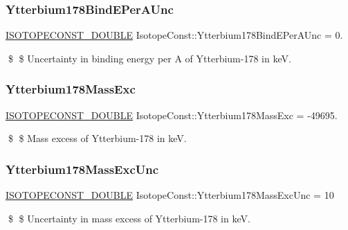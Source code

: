\subsubsection{\texorpdfstring{Ytterbium178\+Bind\+E\+Per\+A\+Unc}{Ytterbium178BindEPerAUnc}}
{\footnotesize\ttfamily \mbox{\hyperlink{group___isotope_const-_macros_ga8f45a7272ce02c0b4c65c44636ed719a}{I\+S\+O\+T\+O\+P\+E\+C\+O\+N\+S\+T\+\_\+\+D\+O\+U\+B\+LE}} Isotope\+Const\+::\+Ytterbium178\+Bind\+E\+Per\+A\+Unc = 0.}

\$ \$ Uncertainty in binding energy per A of Ytterbium-\/178 in keV. \mbox{\label{group___isotope_const-_ytterbium-_yb178_ga70bf7a4345fe17d8db1437e68f3b926a}} 
\subsubsection{\texorpdfstring{Ytterbium178\+Mass\+Exc}{Ytterbium178MassExc}}
{\footnotesize\ttfamily \mbox{\hyperlink{group___isotope_const-_macros_ga8f45a7272ce02c0b4c65c44636ed719a}{I\+S\+O\+T\+O\+P\+E\+C\+O\+N\+S\+T\+\_\+\+D\+O\+U\+B\+LE}} Isotope\+Const\+::\+Ytterbium178\+Mass\+Exc = -\/49695.}

\$ \$ Mass excess of Ytterbium-\/178 in keV. \mbox{\label{group___isotope_const-_ytterbium-_yb178_ga65285028de54814b0d09c861b18da009}} 
\subsubsection{\texorpdfstring{Ytterbium178\+Mass\+Exc\+Unc}{Ytterbium178MassExcUnc}}
{\footnotesize\ttfamily \mbox{\hyperlink{group___isotope_const-_macros_ga8f45a7272ce02c0b4c65c44636ed719a}{I\+S\+O\+T\+O\+P\+E\+C\+O\+N\+S\+T\+\_\+\+D\+O\+U\+B\+LE}} Isotope\+Const\+::\+Ytterbium178\+Mass\+Exc\+Unc = 10}

\$ \$ Uncertainty in mass excess of Ytterbium-\/178 in keV. \mbox{\label{group___isotope_const-_ytterbium-_yb178_ga5a27f5fe1d9ec55009800f2097170db7}} 

